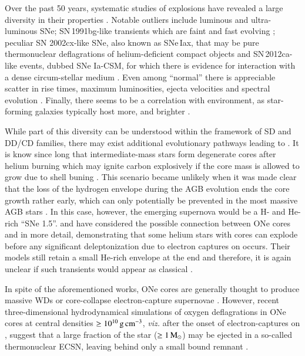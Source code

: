 \documentclass[twocolumn]{aa}
\begin{document}
Over the past 50 years, systematic studies of \ia explosions have revealed a large
diversity in their properties \citep{Taubenberger:2017hoo}. 
Notable outliers include luminous 
\citep[e.g. SN\,1991T;][]{filippenko1992} and ultra-luminous  
\citep[e.g. SNLS-03D3bb;][]{Howell:2006vn} SNe; SN\,1991bg-like transients which
are faint and fast evolving  \citep{ruiz-lapuente1993};  peculiar SN 2002cx-like SNe, 
 also known as SNe\,Iax, that may be pure thermonuclear deflagrations of helium-deficient compact objects \citep[e.g.][]{Li:2003wja,Branch:2004tq,Magee:2016vnu,Jha:2017gwq, Magee:2018aui}
and SN\,2012ca-like events, dubbed SNe Ia-CSM, for which 
there is evidence for interaction with a dense circum-stellar 
medium \citep{Bochenek:2017vok}. 
Even among ``normal'' \ias there is appreciable
scatter in rise times, maximum luminosities, ejecta velocities and spectral evolution   
\citep[][]{Livio:2018rue}. 
Finally, there seems to be a correlation with environment, 
as star-forming  galaxies typically  host more,  and brighter \ias \citep{Maoz:2013hna}. 


While part of this diversity can be understood within the framework of SD and  DD/CD  
families, there may exist additional 
evolutionary pathways leading to \ias. 
It is know since long that intermediate-mass stars form
degenerate cores after helium burning which may ignite carbon
explosively if the core mass is allowed to grow due to shell buning
\citep{rose1969,Arnett:1969,wheeler1978}. This scenario became unlikely
when it was made clear that the loss of the hydrogen envelope during the
AGB evolution ends the core growth rather early, which can only
potentially be prevented in the most massive AGB stars \citep[see][and references therein]{Iben:1983ts}. 
In this case, however, the emerging supernova would be a H- and He-rich
“SNe 1.5”.
\cite{waldman2006a} and \cite{waldman2008} have considered the possible connection between ONe cores and \ias in more detail, 
demonstrating that some helium stars with \one cores can explode before any significant deleptonization due to electron captures on  occurs.
Their models  still retain a small He-rich envelope at the end and therefore, it is again unclear if such transients would appear as classical \ias. 

In spite of the aforementioned works, ONe cores are generally thought to produce massive WDs or core-collapse electron-capture supernovae \citep[ECSNe; e.g.,][]{nomoto1991,gutierrez1996,Takahashi:2013ena}. 
However, recent three-dimensional hydrodynamical 
simulations of oxygen deflagrations in ONe cores at 
central densities $\ge 10^{10}\mathrm{\,g\,cm^{-3}}$, {\it viz.} after the onset of electron-captures on , 
suggest that a large fraction of the star ($\ge 1\mathrm{\,M_\odot}$) may be 
ejected in a so-called thermonuclear ECSN, leaving 
behind only a small bound remnant \citep{Jones:2016asr,Jones:2018ule}.  
\end{document}
